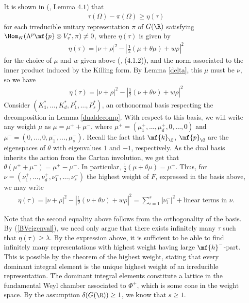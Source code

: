 \noindent It is shown in (\cite{BV}, Lemma $4.1$) that 
\begin{align}\label{BVeigenval}
    \tau(\Omega)-\pi(\Omega)\geq \eta(\tau)
\end{align}
for each irreducible unitary representation $\pi$ of $G(\R)$ satisfying $\Hom_K(\Lambda^p\mf{p}\otimes V_\tau^*,\pi)\neq 0$, where $\eta(\tau)$ is given by
\begin{align}\label{delta}
    \eta(\tau) = |\nu+\rho|^2-\left|\frac12(\mu+\theta\mu)+w\rho\right|^2
\end{align}
for the choice of $\mu$ and $w$ given above (\cite{BV}, ($4.1.2$)), and the norm associated to the inner product induced by the Killing form. By Lemma \ref{delta}, this $\mu$ must be $\nu$, so we have
\begin{align*}
    \eta(\tau) = |\nu+\rho|^2-\left|\frac12(\nu+\theta\nu)+w\rho\right|^2
\end{align*}
Consider $(K_1^*,\dots,K_d^*,P_1^*,\dots,P_s^*)$, an orthonormal basis respecting the decomposition in Lemma \ref{dualdecomp}. With respect to this basis, we will write any weight $\mu$ as $\mu=\mu^++ \mu^-$, where $\mu^+=(\mu^+_1,\dots,\mu^+_d,0,\dots,0)$ and $\mu^-=(0,\dots,0,\mu^-_1,\dots,\mu^-_s)$. Recall the fact that $\mf{k}_\C$, $\mf{p}_\C$ are the eigenspaces of $\theta$ with eigenvalues $1$ and $-1$, respectively. As the dual basis inherits the action from the Cartan involution, we get that $\theta(\mu^++ \mu^-)=\mu^+- \mu^-$. In particular, $\frac12(\mu+\theta\mu) = \mu^+$. Thus, for $\nu=(\nu_1^+,\dots,\nu_d^+,\nu_1^-,\dots,\nu_s^-)$ the highest weight of $F$, expressed in the basis above, we may write
\begin{align}\label{eta}
    \eta(\tau) = |\nu+\rho|^2-\left\vert\frac12(\nu+\theta\nu)+w\rho\right\vert^2 = \sum_{i=1}^s |\nu_i^-|^2+\text{linear terms in }\nu.
\end{align}

\noindent Note that the second equality above follows from the orthogonality of the basis. By (\ref{BVeigenval}), we need only argue that there exists infinitely many $\tau$ such that $\eta(\tau)\geq \lambda$. By the expression above, it is sufficient to be able to find infinitely many representations with highest weight having large $\mf{h}^-$-part. This is possible by the theorem of the highest weight, stating that every dominant integral element is the unique highest weight of an irreducible representation. The dominant integral elements constitute a lattice in the fundamental Weyl chamber associated to $\Phi^+$, which is some cone in the weight space. By the assumption $\delta(G(\R))\geq 1$, we know that $s\geq 1$. 

